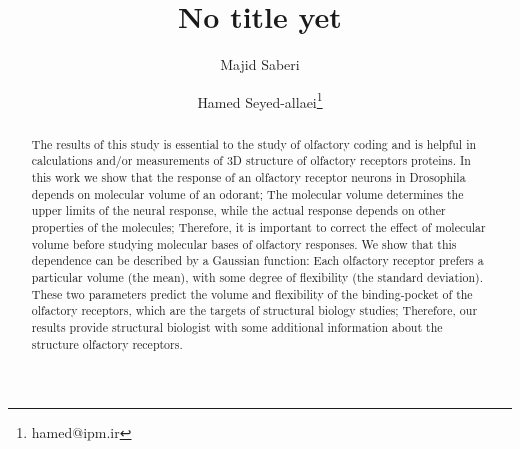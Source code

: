 \documentclass[11pt]{paper} %
\title{No title yet}
\author{Majid Saberi \and Hamed Seyed-allaei\thanks{hamed@ipm.ir}}
\begin{document}
\maketitle

\begin{abstract}
	The results of this study is essential to the study of olfactory coding and is helpful in calculations and/or measurements of 3D  structure of olfactory receptors proteins.
	In this work we show that the response of an olfactory receptor neurons in Drosophila depends on molecular volume of an odorant;  
	The molecular volume determines the upper limits of the neural response, 
	while the actual response depends on other properties of the molecules; 
	Therefore, it is important to correct the effect of molecular volume before studying molecular bases of olfactory responses.
	We show that this dependence can be described by a Gaussian function: 
	Each olfactory receptor prefers a particular volume (the mean), 
	with some degree of flexibility (the standard deviation). 
	These two parameters predict the volume and flexibility of the binding-pocket of the olfactory receptors, 
	which are the targets of structural biology studies; 
	Therefore, our results provide structural biologist with some additional information about the structure olfactory receptors. 
\end{abstract}
\end{document}
